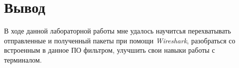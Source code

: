 \documentclass[a4paper]{article}
\begin{document}
  \section{Вывод}

  В ходе данной лабораторной работы мне удалось научитсья перехватывать отправленные и
  полученный пакеты при помощи \textit{Wireshark}, разобраться со встроенным в данное 
  ПО фильтром, улучшить свои навыки работы с терминалом.
\end{document}
